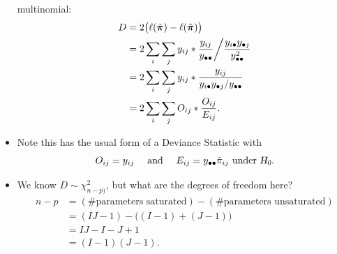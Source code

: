 \documentclass[oneside]{book}\usepackage[]{graphicx}\usepackage[svgnames]{xcolor}
\let\log\relax%
\newcommand{\HN}{\textsl{H}_{\textsl{0}}}%
\providecommand{\Vector}[1]{\bm{#1}}%
\begin{document}
\begin{itemize}
          multinomial:
          \begin{align*}
              D
               & =2\bigl(\ell(\tilde{\Vector{\pi}})-\ell(\hat{\Vector{\pi}})\bigr)                                                             \\
               & =2\sum_i\sum_j y_{ij}\log*{\frac{y_{ij}}{y_{\bullet\bullet}}\bigg/\frac{y_{i \bullet} y_{\bullet j}}{y_{\bullet\bullet}^{2}}} \\
               & =2\sum_i\sum_j y_{ij}\log*{\frac{y_{ij}}{y_{i\bullet}y_{\bullet j}/y_{\bullet\bullet}}}                                       \\
               & =2\sum_i\sum_j O_{ij}\log*{\frac{O_{ij}}{E_{ij}}}.
          \end{align*}
    \item Note this has the usual form of a Deviance Statistic with
          \[ O_{ij}=y_{ij}\quad\text{ and }\quad E_{ij}=y_{\bullet\bullet}\hat{\pi}_{ij}\text{ under $ \HN $}. \]
    \item We know $ D \sim \chi^2_{n-p)} $, but what are the degrees of freedom here?
          \begin{align*}
              n-p
               & =(\text{\# parameters saturated})-(\text{\# parameters unsaturated}) \\
               & =(IJ-1)-\bigl((I-1)+(J-1)\bigr)                                      \\
               & =IJ-I-J+1                                                            \\
               & =(I-1)(J-1).
          \end{align*}
\end{itemize}
\end{document}

